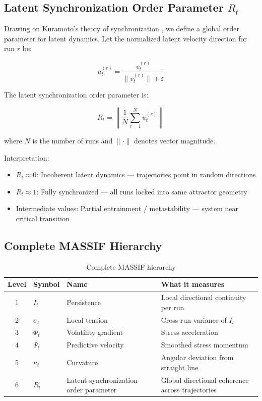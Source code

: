 \documentclass{article}
\begin{document}
\subsection{Latent Synchronization Order Parameter $R_t$}

Drawing on Kuramoto's theory of synchronization \cite{kuramoto1984}, we define a global order parameter for latent dynamics. Let the normalized latent velocity direction for run $r$ be:

$$u_t^{(r)} = \frac{v_t^{(r)}}{\|v_t^{(r)}\| + \varepsilon}$$

The latent synchronization order parameter is:

$$R_t = \left\| \frac{1}{N} \sum_{r=1}^{N} u_t^{(r)} \right\|$$

where $N$ is the number of runs and $\|\cdot\|$ denotes vector magnitude.

Interpretation:
\begin{itemize}
    \item $R_t \approx 0$: Incoherent latent dynamics — trajectories point in random directions
    \item $R_t \approx 1$: Fully synchronized — all runs locked into same attractor geometry
    \item Intermediate values: Partial entrainment / metastability — system near critical transition
\end{itemize}

\subsection{Complete MASSIF Hierarchy}

\begin{table}[H]
\centering
\caption{Complete MASSIF hierarchy}
\label{tab:hierarchy}
\begin{tabular}{clll}
\toprule
Level & Symbol & Name & What it measures \\
\midrule
1 & $I_t$ & Persistence & Local directional continuity per run \\
2 & $\sigma_t$ & Local tension & Cross-run variance of $I_t$ \\
3 & $\Phi_t$ & Volatility gradient & Stress acceleration \\
4 & $\Psi_t$ & Predictive velocity & Smoothed stress momentum \\
5 & $\kappa_t$ & Curvature & Angular deviation from straight line \\
6 & $R_t$ & Latent synchronization order parameter & Global directional coherence across trajectories \\
\bottomrule
\end{tabular}
\end{table}
\end{document}
